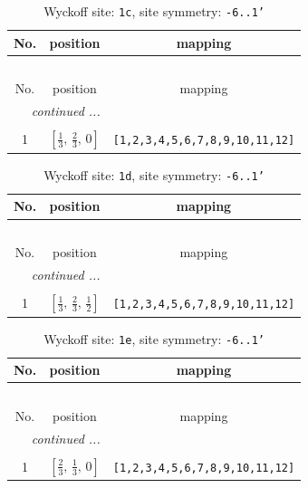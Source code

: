 \documentclass[fleqn,8pt]{jsarticle}
\begin{document}
\begin{longtable}{ccc}
\caption{Wyckoff site: {\tt 1c}, site symmetry: {\tt -6..1'}}
 \\
 \hline \hline
No. & position & mapping \\ \hline \endfirsthead

\multicolumn{2}{l}{\tablename\ \thetable{}} \\
 \hline \hline
No. & position & mapping \\ \hline \endhead

 \hline \hline
\multicolumn{2}{r}{\footnotesize\it continued ...} \\ \endfoot

 \hline \hline
\multicolumn{2}{r}{} \\ \endlastfoot

1 & $\left[ \frac{1}{3},\, \frac{2}{3},\, 0 \right]$ & {\tt [1,2,3,4,5,6,7,8,9,10,11,12]} \\
\end{longtable}
\renewcommand{\arraystretch}{1.2}
\begin{longtable}{ccc}
\caption{Wyckoff site: {\tt 1d}, site symmetry: {\tt -6..1'}}
 \\
 \hline \hline
No. & position & mapping \\ \hline \endfirsthead

\multicolumn{2}{l}{\tablename\ \thetable{}} \\
 \hline \hline
No. & position & mapping \\ \hline \endhead

 \hline \hline
\multicolumn{2}{r}{\footnotesize\it continued ...} \\ \endfoot

 \hline \hline
\multicolumn{2}{r}{} \\ \endlastfoot

1 & $\left[ \frac{1}{3},\, \frac{2}{3},\, \frac{1}{2} \right]$ & {\tt [1,2,3,4,5,6,7,8,9,10,11,12]} \\
\end{longtable}
\renewcommand{\arraystretch}{1.2}
\begin{longtable}{ccc}
\caption{Wyckoff site: {\tt 1e}, site symmetry: {\tt -6..1'}}
 \\
 \hline \hline
No. & position & mapping \\ \hline \endfirsthead

\multicolumn{2}{l}{\tablename\ \thetable{}} \\
 \hline \hline
No. & position & mapping \\ \hline \endhead

 \hline \hline
\multicolumn{2}{r}{\footnotesize\it continued ...} \\ \endfoot

 \hline \hline
\multicolumn{2}{r}{} \\ \endlastfoot

1 & $\left[ \frac{2}{3},\, \frac{1}{3},\, 0 \right]$ & {\tt [1,2,3,4,5,6,7,8,9,10,11,12]} \\
\end{longtable}
\end{document}
